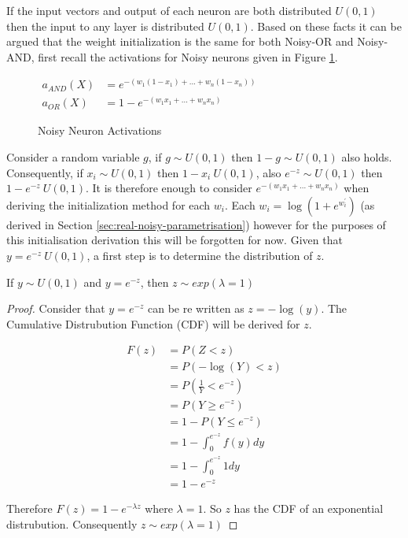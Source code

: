 \noindent
\begin{minipage}[t]{0.55\textwidth}
\vspace{0px}
If the input vectors and output of each neuron are both distributed $U(0,1)$ then the input to any layer is distributed $U(0,1)$. Based on these facts it can be argued that the weight initialization is the same for both Noisy-OR and Noisy-AND, first recall the activations for Noisy neurons given in Figure \ref{fig:recall-noisy-activations}.\\
\end{minipage}
\hspace{0.05\textwidth}
\begin{minipage}[t]{0.4\textwidth}
\vspace{0px}
\begin{figure}[H]
\vspace{0px}
{\centering
$ \displaystyle
\begin{aligned}
a_{AND}(X) &= e^{-(w_1(1 - x_1) + ... + w_n(1 - x_n))}\\
a_{OR}(X) &= 1 - e^{-(w_1x_1 + ... + w_nx_n)}
\end{aligned}
$
\par}
\caption{Noisy Neuron Activations}
\label{fig:recall-noisy-activations}
\end{figure}
\end{minipage}

Consider a random variable $g$, if $g \sim U(0,1)$ then $1 - g \sim U(0,1)$ also holds. Consequently, if $x_i \sim U(0,1)$ then $1 - x_i ~ U(0,1)$, also $e^{-z} \sim U(0,1)$ then $1 - e^{-z} ~ U(0,1)$. It is therefore enough to consider $e^{-(w_1x_1 + ... + w_nx_n)}$ when deriving the initialization method for each $w_i$. Each $w_i = \log(1 + e^{w^{'}_i})$ (as derived in Section \ref{sec:real-noisy-parametrisation}) however for the purposes of this initialisation derivation this will be forgotten for now. Given that $y = e^{-z} ~ U(0,1)$, a first step is to determine the distribution of $z$.\\
\begin{theorem}
	If $y \sim U(0,1)$ and $y = e^{-z}$, then $z \sim exp(\lambda = 1)$
\end{theorem}
\begin{proof}
	Consider that $y = e^{-z}$ can be re written as $z = -\log(y)$. The Cumulative Distrubution Function (CDF) will be derived for $z$.
	
	\begin{align*}
	F(z) &= P(Z < z)\\
	&= P(-\log(Y) < z)\\
	&= P(\frac{1}{Y} < e^{-z})\\
	&= P(Y \geq e^{-z})\\
	&= 1 - P(Y \leq e^{-z})\\
	&= 1 - \int_{0}^{e^{-z}} f(y) dy\\
	&= 1 - \int_{0}^{e^{-z}} 1 dy\\
	&= 1 - e^{-z}
	\end{align*}
	
	Therefore $F(z) = 1 - e^{-\lambda z}$ where $\lambda = 1$. So $z$ has the CDF of an exponential distrubution. Consequently $z \sim exp(\lambda = 1)$
\end{proof}

